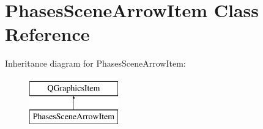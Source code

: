 \hypertarget{class_phases_scene_arrow_item}{\section{Phases\-Scene\-Arrow\-Item Class Reference}
\label{class_phases_scene_arrow_item}
}
Inheritance diagram for Phases\-Scene\-Arrow\-Item\-:\begin{figure}[H]
\begin{center}
\leavevmode
\includegraphics[height=2.000000cm]{class_phases_scene_arrow_item}
\end{center}
\end{figure}

